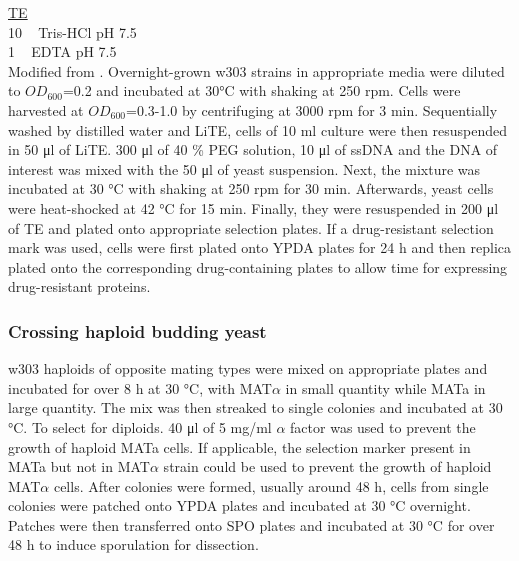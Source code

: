 \underline{TE}\\
10 \si{\milli\Molar} Tris-HCl pH 7.5\\
1 \si{\milli\Molar} EDTA pH 7.5\\

Modified from \cite{Gietz2007High-efficiencyMethod}. Overnight-grown w303 strains in appropriate media were diluted to $OD_{600}$=0.2 and incubated at 30\si{\celsius} with shaking at 250 rpm. Cells were harvested at $OD_{600}$=0.3-1.0 by centrifuging at 3000 rpm for 3 \si{\minute}. Sequentially washed by distilled water and LiTE, cells of 10 \si{\milli\litre} culture were then resuspended in 50 \si{\micro\litre} of LiTE. 300 \si{\micro\litre} of 40 \% PEG solution, 10 \si{\micro\litre} of ssDNA and the DNA of interest was mixed with the 50 \si{\micro\litre} of yeast suspension. Next, the mixture was incubated at 30 \si{\celsius} with shaking at 250 rpm for 30 \si{\minute}. Afterwards, 
yeast cells were heat-shocked at 42 \si{\celsius} for 15 \si{\minute}. Finally, they were resuspended in 200 \si{\micro\litre} of TE and plated onto appropriate selection plates. If a drug-resistant selection mark was used, cells were first plated onto YPDA plates for 24 \si{\hour} and then replica plated onto the corresponding drug-containing plates to allow time for expressing drug-resistant proteins.


\subsubsection{Crossing haploid budding yeast}

w303 haploids of opposite mating types were mixed on appropriate plates and incubated for over 8 \si{\hour} at 30 \si{\celsius}, with MAT$\alpha$ in small quantity while MATa in large quantity. The mix was then streaked to single colonies and incubated at 30 \si{\celsius}. To select for diploids. 40 \si{\micro\litre} of 5 \si{\milli\gram/\milli\litre} $\alpha$ factor was used to prevent the growth of haploid MATa cells. If applicable, the selection marker present in MATa but not in MAT$\alpha$ strain could be used to prevent the growth of haploid MAT$\alpha$ cells. After colonies were formed, usually around 48 \si{\hour}, cells from single colonies were patched onto YPDA plates and incubated at 30 \si{\celsius} overnight. Patches were then transferred onto SPO plates and incubated at 30 \si{\celsius} for over 48 \si{\hour} to induce sporulation for dissection. 

